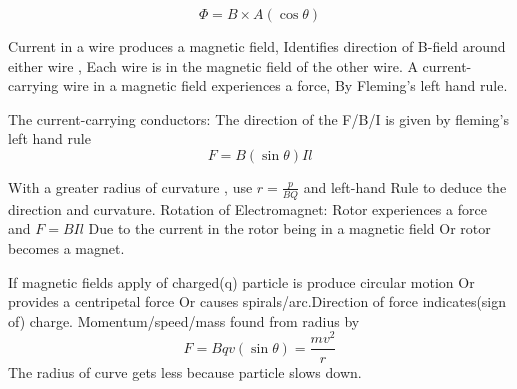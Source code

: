 \documentclass[a4paper]{article}
\begin{document}
\begin{defi}
\begin{equation*}
    \Phi=B\times A (\cos\theta)
\end{equation*}
\begin{defi}
Current in a wire produces a magnetic field, Identifies direction of B-field around either wire , Each wire is in the magnetic field of the other wire. A current-carrying wire in a magnetic field experiences a force, By Fleming's left hand rule.
\end{defi}
The current-carrying conductors: The direction of the F/B/I is given by fleming's left hand rule
\begin{equation*}
    F=B(\sin\theta) Il
\end{equation*}
\begin{defi}
 With a greater radius of curvature , use $r=\frac{p}{BQ}$ and left-hand Rule to deduce the direction and curvature. Rotation of Electromagnet: Rotor experiences a force and $F=BIl$ Due to the current in the rotor being in a magnetic field Or rotor becomes a magnet.
\end{defi}
If magnetic fields apply of charged(q) particle is produce circular motion Or provides a centripetal force Or causes spirals/arc.Direction of force indicates(sign of) charge.
Momentum/speed/mass found from radius by 
\begin{equation*}
     F=Bqv(\sin\theta)=\frac{mv^2}{r}
\end{equation*}
The radius of curve gets less because particle slows down.
\end{defi}
\end{document}
